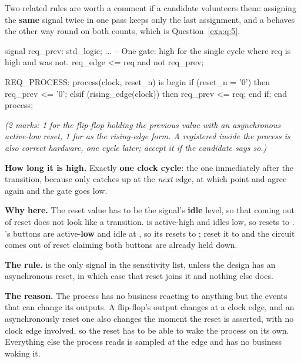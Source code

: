 Two related rules are worth a comment if a candidate volunteers them: assigning the \textbf{same}
signal twice in one pass keeps only the last assignment, and a  behaves the other way
round on both counts, which is Question~\ref{exa:q:5}.

\begin{vhdlcode}
signal req_prev: std_logic;
...
    -- One gate: high for the single cycle where req is high and was not.
    req_edge <= req and not req_prev;

    REQ_PROCESS: process(clock, reset_n) is
    begin
        if (reset_n = '0') then
            req_prev <= '0';
        elsif (rising_edge(clock)) then
            req_prev <= req;
        end if;
    end process;
\end{vhdlcode}

\noindent\textit{(2 marks: 1 for the flip-flop holding the previous value with an asynchronous
active-low reset, 1 for  as the rising-edge form. A registered
 inside the process is also correct hardware, one cycle later; accept it if the
candidate says so.)}

\textbf{How long it is high.} Exactly \textbf{one clock cycle}: the one immediately after the
transition, because  only catches up at the \emph{next} edge, at which point
 and  agree again and the gate goes low.

\textbf{Why  here.} The reset value has to be the signal's \textbf{idle} level, so that
coming out of reset does not look like a transition.  is active-high and idles low, so
 resets to . 's buttons are active-\textbf{low} and idle
at , so its  resets to ; reset it to  and the
circuit comes out of reset claiming both buttons are already held down. 

\textbf{The rule.}  is the only signal in the sensitivity list, unless the design has an
asynchronous reset, in which case that reset joins it and nothing else does.

\textbf{The reason.} The process has no business reacting to anything but the events that can
change its outputs. A flip-flop's output changes at a clock edge, and an asynchronously reset one
also changes the moment the reset is asserted, with no clock edge involved, so the reset has to be
able to wake the process on its own. Everything else the process reads is sampled \emph{at} the edge
and has no business waking it. 

